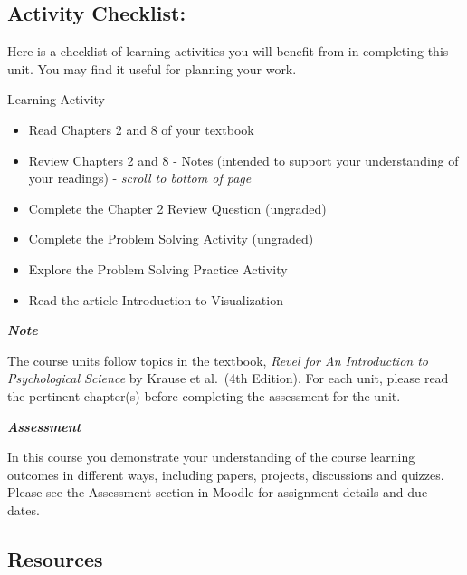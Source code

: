 \documentclass[
]{book}
\providecommand{\tightlist}{%
  \setlength{\itemsep}{0pt}\setlength{\parskip}{0pt}}
\begin{document}
\hypertarget{activity-checklist}{%
\subsection*{Activity Checklist:}\label{activity-checklist}}

Here is a checklist of learning activities you will benefit from in completing this unit. You may find it useful for planning your work.

\begin{reflect}
{Learning Activity}

\begin{itemize}
\tightlist
\item
  Read Chapters 2 and 8 of your textbook
\item
  Review Chapters 2 and 8 - Notes (intended to support your understanding of your readings) - \emph{scroll to bottom of page}
\item
  Complete the Chapter 2 Review Question (ungraded)
\item
  Complete the Problem Solving Activity (ungraded)
\item
  Explore the Problem Solving Practice Activity
\item
  Read the article Introduction to Visualization
\end{itemize}
\end{reflect}

\begin{caution}
\textbf{\emph{Note}}

The course units follow topics in the textbook, \emph{Revel for An Introduction to Psychological Science} by Krause et al.~(4th Edition). For each unit, please read the pertinent chapter(s) before completing the assessment for the unit.
\end{caution}

\begin{assessment}
\textbf{\emph{Assessment}}

In this course you demonstrate your understanding of the course learning outcomes in different ways, including papers, projects, discussions and quizzes. Please see the Assessment section in Moodle for assignment details and due dates.
\end{assessment}

\hypertarget{resources}{%
\subsection*{Resources}\label{resources}}
\end{document}
